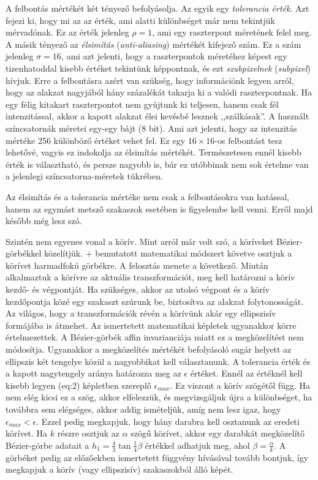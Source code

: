 \documentclass[12pt]{report}
\theoremstyle{definition}
\newcommand{\inenglish}[1]{\textsl{#1}}
\begin{document}
A felbontás mértékét két tényező befolyásolja. Az egyik egy \emph{tolerancia
érték}. Azt fejezi ki, hogy mi az az érték, ami alatti különbséget már nem
tekintjük mérvadónak. Ez az érték jelenleg $\rho=1$, ami egy raszterpont
méretének felel meg. A másik tényező az \emph{élsimítás}
(\inenglish{anti-aliasing}) mértékét kifejező szám. Ez a szám jelenleg
$\sigma=16$, ami azt jelenti, hogy a raszterpontok méretéhez képest egy
tizenhatoddal kisebb értéket tekintünk képpontnak, és ezt \emph{szubpixelnek}
(\inenglish{subpixel}) hívjuk. Erre a felbontásra azért van szükség, hogy
információnk legyen arról, hogy az alakzat nagyjából hány százalékát takarja ki
a valódi raszterpontnak. Ha egy félig kitakart raszterpontot nem gyújtunk ki
teljesen, hanem csak fél intenzitással, akkor a kapott alakzat élei kevésbé
lesznek ,,szálkásak''. A használt színcsatornák méretei egy-egy bájt ($8$ bit).
Ami azt jelenti, hogy az intenzitás mértéke 256 különböző értéket vehet fel. Ez
egy $16\times16$-os felbontást tesz lehetővé, vagyis ez indokolja az élsimítás
mértékét. Természetesen ennél kisebb érték is választható, és persze nagyobb
is, bár ez utóbbinak nem sok értelme van a jelenlegi színcsatorna-méretek
tükrében.

Az élsimítás és a tolerancia mértéke nem csak a felbontásokra van hatással,
hanem az egymást metsző szakaszok esetében is figyelembe kell venni. Erről majd
később még lesz szó.

Szintén nem egyenes vonal a körív. Mint arról már volt szó, a köríveket
Bézier-görbékkel közelítjük. \Az+ bemutatott
matematikai módszert követve osztjuk a körívet harmadfokú görbékre. A
felosztás menete a következő. Miután alkalmaztuk a körívre az aktuális
transzformációt, meg kell határozni a körív kezdő- és végpontját. Ha
szükséges, akkor az utolsó végpont és a körív kezdőpontja közé egy szakaszt
szúrunk be, biztosítva az alakzat folytonosságát. Az világos, hogy a
transzformációk révén a körívünk akár egy ellipszisív formájába is
átmehet. Az ismertetett matematikai képletek ugyanakkor körre értelmezettek. A
Bézier-görbék affin invarianciája miatt ez a megközelítést nem módosítja.
Ugyanakkor a megközelítés mértékét befolyásoló sugár helyett az ellipszis két
tengelye közül a nagyobbikat kell választanunk. A tolerancia érték és a kapott
nagytengely aránya határozza meg az $\epsilon$ értéket. Ennél az értéknél kell
kisebb legyen \aref({eq:2}) képletben szereplő $\epsilon_{max}$. Ez viszont a
körív szögétől függ. Ha nem elég kicsi ez a szög, akkor elfelezzük, és
megvizsgáljuk újra a különbséget, ha továbbra sem elégséges, akkor addig
ismételjük, amíg nem lesz igaz, hogy $\epsilon_{max} < \epsilon$. Ezzel pedig
megkapjuk, hogy hány darabra kell osztanunk az eredeti körívet. Ha $k$ részre
osztjuk az $\alpha$ szögű körívet, akkor egy darabkát megközelítő
Bézier-görbe adatait a $h_1 = \frac{4}{3} \tan{\frac{1}{4} \beta}$ értékkel
adhatjuk meg, ahol $\beta = \frac{\alpha}{k}$. A görbéket pedig az előzőekben
ismertetett függvény hívásával tovább bontjuk, így megkapjuk a körív (vagy
ellipszisív) szakaszokból álló képét.
\end{document}
